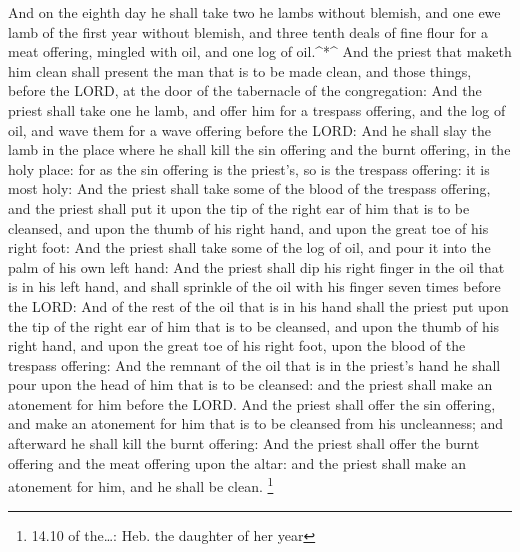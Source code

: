  And on the eighth day he shall take two he lambs without
blemish, and one ewe lamb of the first year without blemish, and three
tenth deals of fine flour for a meat offering, mingled with oil, and one
log of oil.\^{}*\^{}  And the priest that maketh him clean
shall present the man that is to be made clean, and those things, before
the LORD, at the door of the tabernacle of the congregation:
 And the priest shall take one he lamb, and offer him for a
trespass offering, and the log of oil, and wave them for a wave offering
before the LORD:  And he shall slay the lamb in the place
where he shall kill the sin offering and the burnt offering, in the holy
place: for as the sin offering is the priest's, so is the trespass
offering: it is most holy:  And the priest shall take some
of the blood of the trespass offering, and the priest shall put it upon
the tip of the right ear of him that is to be cleansed, and upon the
thumb of his right hand, and upon the great toe of his right foot:
 And the priest shall take some of the log of oil, and pour
it into the palm of his own left hand:  And the priest
shall dip his right finger in the oil that is in his left hand, and
shall sprinkle of the oil with his finger seven times before the LORD:
 And of the rest of the oil that is in his hand shall the
priest put upon the tip of the right ear of him that is to be cleansed,
and upon the thumb of his right hand, and upon the great toe of his
right foot, upon the blood of the trespass offering:  And
the remnant of the oil that is in the priest's hand he shall pour upon
the head of him that is to be cleansed: and the priest shall make an
atonement for him before the LORD.  And the priest shall
offer the sin offering, and make an atonement for him that is to be
cleansed from his uncleanness; and afterward he shall kill the burnt
offering:  And the priest shall offer the burnt offering
and the meat offering upon the altar: and the priest shall make an
atonement for him, and he shall be clean. \footnote{14.10 of the\ldots:
  Heb. the daughter of her year}

